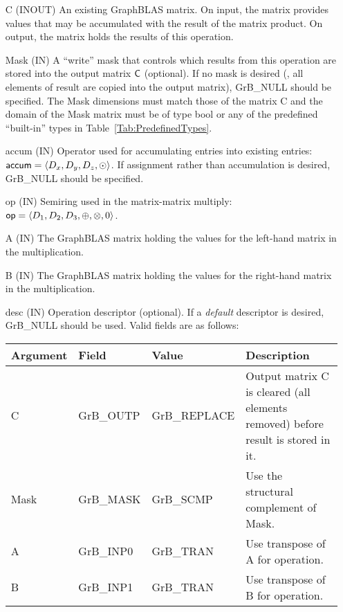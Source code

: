 \begin{itemize}[leftmargin=1.1in]
    \item[{\sf C}]    ({\sf INOUT}) An existing GraphBLAS matrix. On
    input, the matrix provides values that may be accumulated with the
    result of the matrix product.   On output, the matrix holds the
    results of this operation.

    \item[{\sf Mask}] ({\sf IN}) A ``write'' mask that controls which
    results from this operation are stored into the output matrix
    ${\sf C}$ (optional).  If no mask is desired (\ie, all elements
    of result are copied into the output matrix), {\sf GrB\_NULL}
    should be specified. The Mask dimensions must match those of the
    matrix {\sf C} and the domain of the {\sf Mask} matrix must be
    of type {\sf bool} or any of the predefined ``built-in'' types in
    Table~\ref{Tab:PredefinedTypes}.

    \item[{\sf accum}] ({\sf IN}) Operator used for accumulating entries
    into existing  entries: ${\sf accum} = \langle D_x,
    D_y, D_z,\odot \rangle$. If assignment rather than accumulation is
    desired, {\sf GrB\_NULL} should be specified.

    \item[{\sf op}] ({\sf IN}) Semiring used in the matrix-matrix
    multiply: ${\sf op}=\langle D_1,D_2,D_3,\oplus,\otimes,0 \rangle$.

    \item[{\sf A}] ({\sf IN}) The GraphBLAS matrix holding the values
    for the left-hand matrix in the multiplication.

    \item[{\sf B}] ({\sf IN}) The GraphBLAS matrix holding the values
    for the right-hand matrix in the multiplication.

    \item[{\sf desc}] ({\sf IN}) Operation descriptor (optional). If
    a \emph{default} descriptor is desired, {\sf GrB\_NULL} should be
    used. Valid fields are as follows: 

    \begin{tabular}{lllp{2.75in}}
    Argument   & Field           & Value               & Description \\ \hline
    {\sf C}    & {\sf GrB\_OUTP} & {\sf GrB\_REPLACE}  & Output matrix {\sf C} is cleared (all elements removed) before result is stored in it. \\
    {\sf Mask} & {\sf GrB\_MASK} & {\sf GrB\_SCMP}     & Use the structural complement of {\sf Mask}. \\
    {\sf A}    & {\sf GrB\_INP0} & {\sf GrB\_TRAN}     & Use transpose of {\sf A} for operation. \\
    {\sf B}    & {\sf GrB\_INP1} & {\sf GrB\_TRAN}     & Use transpose of {\sf B} for operation. \\
    \end{tabular}
\end{itemize}

